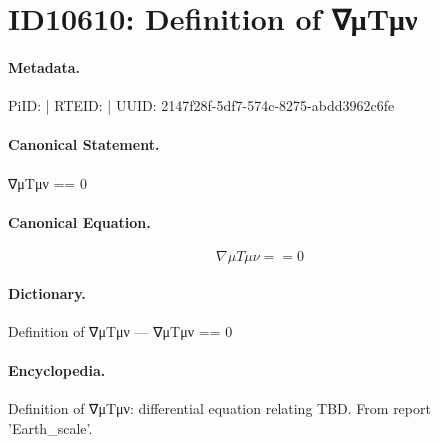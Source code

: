 \section*{ID10610: Definition of ∇μTμν}
\paragraph{Metadata.}
PiID:  | RTEID:  | UUID: 2147f28f-5df7-574c-8275-abdd3962c6fe

\paragraph{Canonical Statement.}
∇μTμν == 0

\paragraph{Canonical Equation.}
\[
∇μTμν == 0
\]

\paragraph{Dictionary.}
Definition of ∇μTμν — ∇μTμν == 0

\paragraph{Encyclopedia.}
Definition of ∇μTμν: differential equation relating TBD. From report 'Earth\_scale'.
